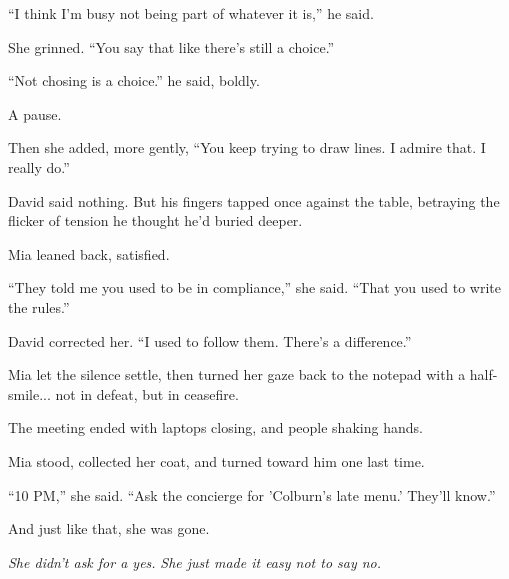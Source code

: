 ``I think I’m busy not being part of whatever it is,'' he said.

She grinned. ``You say that like there’s still a choice.''

``Not chosing is a choice.'' he said, boldly.

A pause.

Then she added, more gently, ``You keep trying to draw lines. I admire that. I really do.''

David said nothing. But his fingers tapped once against the table, betraying the flicker of tension he thought 
he’d buried deeper.

Mia leaned back, satisfied.

``They told me you used to be in compliance,'' she said. ``That you used to write the rules.''

David corrected her. ``I used to follow them. There's a difference.'' 

Mia let the silence settle, then turned her gaze back to the notepad with a half-smile... 
not in defeat, but in ceasefire.

The meeting ended with laptops closing, and people shaking hands.

Mia stood, collected her coat, and turned toward him one last time.

``10 PM,'' she said. ``Ask the concierge for 'Colburn’s late menu.' They'll know.''

And just like that, she was gone.

\textit{She didn’t ask for a yes.}
\textit{She just made it easy not to say no.}

\medskip

